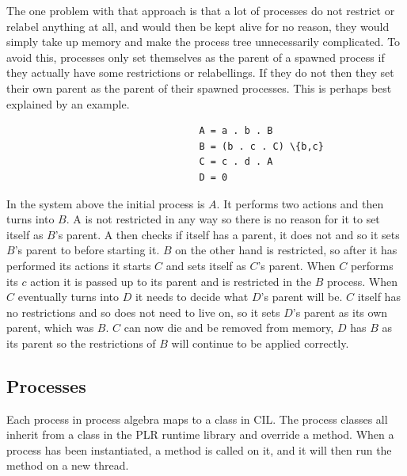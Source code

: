 	The one problem with that approach is that a lot of processes do not 
	restrict or relabel anything at all, and would then be kept alive for no 
	reason, they would simply take up memory and make the process tree 
	unnecessarily complicated. To avoid this, processes only set themselves as 
	the parent of a spawned process if they actually have some restrictions or 
	relabellings. If they do not then they set their own parent as the parent of 
	their spawned processes. This is perhaps best explained by an example.
	
	\begin{verbatim}
			                      A = a . b . B
			                      B = (b . c . C) \{b,c}
			                      C = c . d . A
			                      D = 0
	\end{verbatim}
	
	In the system above the initial process is $A$. It performs two actions and 
	then turns into $B$. A is not restricted in any way so there is no reason 
	for it to set itself as $B$'s parent. A then checks if itself has a parent, 
	it does not and so it sets $B$'s parent to  before starting it.
	$B$ on the other hand is restricted, so after it has performed its actions 
	it starts $C$ and sets itself as $C$'s parent. When $C$ performs its $c$ 
	action it is passed up to its parent and is restricted in the $B$ process. 
	When $C$ eventually turns into $D$ it needs to decide what $D$'s parent will 
	be. $C$ itself has no restrictions and so does not need to live on, so it 
	sets $D$'s parent as its own parent, which was $B$. $C$ can now die and be 
	removed from memory, $D$ has $B$ as its parent so the restrictions of $B$ 
	will continue to be applied correctly.
	
	\subsection{Processes}
	Each process in process algebra maps to a class in CIL. The process classes 
	all inherit from a  class in the PLR runtime library and 
	override a  method. When a process has been instantiated, a 
	 method is called on it, and it will then run the 
	 method on a new thread.

